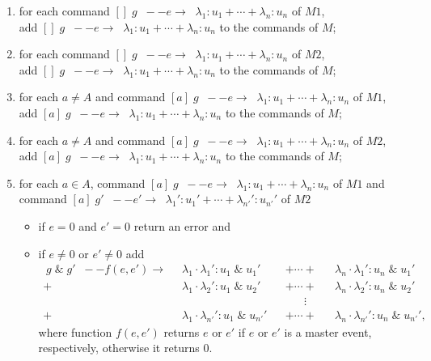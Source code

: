 \documentclass{article}
\newcommand{\arc}[1]{\;\;--{#1}\longrightarrow \;\;}
\begin{document}
\begin{enumerate}
	\item for each command $[] \; g \arc{e}   \lambda_1 : u_1 + \cdots + \lambda_n : u_n$ of $M1$, \\ 
	add	$[] \; g \arc{e}   \lambda_1 : u_1 + \cdots + \lambda_n : u_n$ to the commands of $M$;
	
	\item for each command $[] \; g \arc{e}   \lambda_1 : u_1 + \cdots + \lambda_n : u_n$ of $M2$, \\ 
	add	$[] \; g \arc{e}   \lambda_1 : u_1 + \cdots + \lambda_n : u_n$ to the commands of $M$;

	\item for each $a \neq A$ and command $[a] \; g \arc{e}   \lambda_1 : u_1 + \cdots + \lambda_n : u_n$ of $M1$, \\ 
	add	$[a] \; g \arc{e}   \lambda_1 : u_1 + \cdots + \lambda_n : u_n$ to the commands of $M$;

	\item for each $a \neq A$ and command $[a] \; g \arc{e}   \lambda_1 : u_1 + \cdots + \lambda_n : u_n$ of $M2$, \\ 
	add	$[a] \; g \arc{e}   \lambda_1 : u_1 + \cdots + \lambda_n : u_n$ to the commands of $M$;

	\item for each $a \in A$, command $[a] \; g \arc{e}   \lambda_1 : u_1 + \cdots + \lambda_n : u_n$ of $M1$ and command $[a] \; g' \arc{e'} \lambda_1' : u_1' + \cdots + \lambda_{n'}' : u_{n'}'$ of $M2$ 
	\begin{itemize}
		\item if $e = 0$ and $e' = 0$ return an error and
		\item if $e \neq 0$ or  $e' \neq 0$ add  
		\begin{align*}
			[a] \; g \; \& \; g' \arc{f(e,e')} &\lambda_1 \cdot \lambda_1' : u_1 \; \& \; u_1' & &+ \cdots + & &\lambda_n \cdot \lambda_1' : u_n \; \& \; u_1' \\
			+&\lambda_1 \cdot \lambda_2' : u_1 \; \& \; u_2' & &+ \cdots + & &\lambda_n \cdot \lambda_2' : u_n \; \& \; u_2' \\
			& &  & \quad \;\:\, \vdots \\
			+&\lambda_1 \cdot \lambda_{n'}' : u_1 \; \& \; u_{n'}' & &+ \cdots + & &\lambda_n \cdot \lambda_{n'}' : u_n \; \& \; u_{n'}',
		\end{align*}
		where function $f(e,e')$ returns $e$ or $e'$ if $e$ or $e'$ is a master event, respectively, otherwise it returns $0$.
	\end{itemize}%
\end{enumerate}
\end{document}
